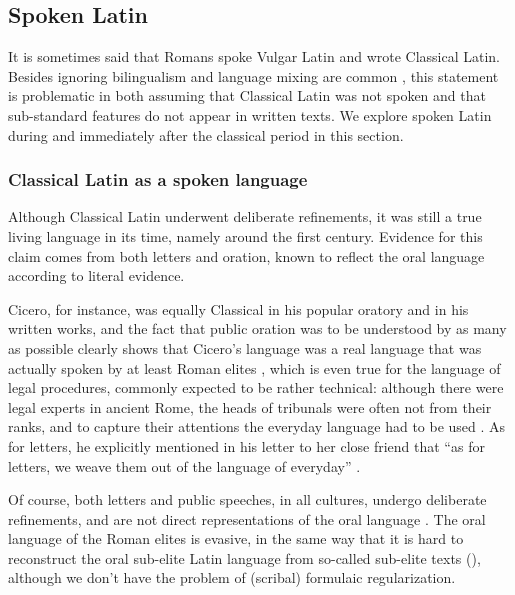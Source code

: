 \documentclass[a4paper, oneside, 12pt]{report}
\newcommand*{\citesec}[1]{\S~{#1}}
\newcommand*{\citepage}[1]{p.~{#1}}
\newcommand*{\citepages}[1]{pp.~{#1}}
\begin{document}
\subsection{Spoken Latin}\label{sec:introduction.history.spoken}

It is sometimes said that Romans spoke Vulgar Latin and wrote Classical Latin.
Besides ignoring bilingualism and language mixing are common
\citep[\citesec{7.2}]{clackson2011blackwell},
this statement is problematic in both  assuming that Classical Latin was not spoken and that sub-standard features do not appear in written texts.
We explore spoken Latin during and immediately after the classical period in this section.


\subsubsection{Classical Latin as a spoken language}

Although Classical Latin underwent deliberate refinements,
it was still a true living language in its time,
namely around the first century.
Evidence for this claim comes from both letters and oration,
known to reflect the oral language according to literal evidence.

Cicero, for instance, was equally Classical in his popular oratory and in his written works,
and the fact that public oration was to be understood by as many as possible
clearly shows that Cicero's language was a real language that was actually spoken 
by at least Roman elites
\citep[\citepage{71}]{leonhardt2013latin},
which is even true for the language of legal procedures,
commonly expected to be rather technical:
although there were legal experts in ancient Rome,
the heads of tribunals were often not from their ranks,
and to capture their attentions the everyday language had to be used
\citep[\citepages{385-386,464-465}]{clackson2011companion}.
As for letters, he explicitly mentioned in his letter to her close friend that 
``as for letters, we weave them out of the language of everyday''
\citep[\citepage{428}]{clackson2011companion}.

Of course, both letters and public speeches, in all cultures, undergo deliberate refinements,
and are not direct representations of the oral language
\citep[\citepages{397-399,434-438}]{clackson2011companion}.
The oral language of the Roman elites is evasive, in the same way that it is hard to  reconstruct the oral sub-elite Latin language
from so-called sub-elite texts (),
although we don't have the problem of (scribal) formulaic regularization.
\end{document}
